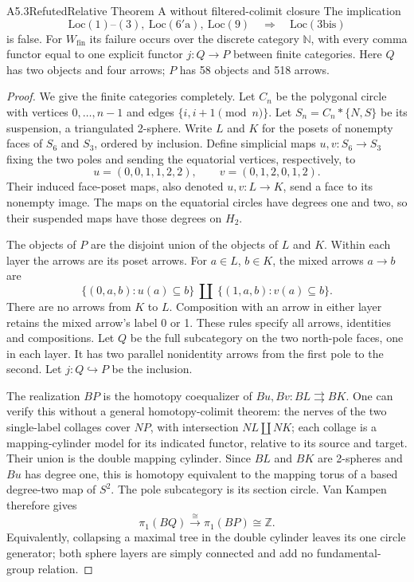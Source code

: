 \begin{claim}{A5.3}{Refuted}{Relative Theorem A without filtered-colimit closure}
\label{A53}
The implication
\[
 \mathrm{Loc}(1)\text{--}(3),\ \mathrm{Loc}(6'\mathrm a),\
 \mathrm{Loc}(9)\quad\Longrightarrow\quad\mathrm{Loc}(3\mathrm{bis})
\]
is false.  For $W_{\mathrm{fin}}$ its failure occurs over the discrete
category $\mathbb N$, with every comma functor equal to one explicit
functor $j:Q\to P$ between finite categories.  Here $Q$ has two objects
and four arrows; $P$ has 58 objects and 518 arrows.
\end{claim}
\begin{proof}
We give the finite categories completely.  Let $C_n$ be the polygonal
circle with vertices $0,\ldots,n-1$ and edges
$\{i,i+1\pmod n\}$.  Let $S_n=C_n*\{N,S\}$ be its suspension,
a triangulated 2-sphere.  Write $L$ and $K$ for the posets of nonempty
faces of $S_6$ and $S_3$, ordered by inclusion.  Define simplicial maps
$u,v:S_6\to S_3$ fixing the two poles and sending the equatorial
vertices, respectively, to
\[
 u=(0,0,1,1,2,2),\qquad v=(0,1,2,0,1,2).
\]
Their induced face-poset maps, also denoted $u,v:L\to K$, send a face
to its nonempty image.  The maps on the equatorial circles have degrees
one and two, so their suspended maps have those degrees on $H_2$.

The objects of $P$ are the disjoint union of the objects of $L$ and $K$.
Within each layer the arrows are its poset arrows.  For $a\in L$,
$b\in K$, the mixed arrows $a\to b$ are
\[
 \{(0,a,b):u(a)\subseteq b\}\ \amalg\
 \{(1,a,b):v(a)\subseteq b\}.
\]
There are no arrows from $K$ to $L$.  Composition with an arrow in
either layer retains the mixed arrow's label 0 or 1.  These rules
specify all arrows, identities and compositions.  Let $Q$ be the full
subcategory on the two north-pole faces, one in each layer.  It has
two parallel nonidentity arrows from the first pole to the second.
Let $j:Q\hookrightarrow P$ be the inclusion.

The realization $BP$ is the homotopy coequalizer of
$Bu,Bv:BL\rightrightarrows BK$.  One can verify this without a
general homotopy-colimit theorem: the nerves of the two single-label
collages cover $NP$, with intersection $NL\amalg NK$; each collage
is a mapping-cylinder model for its indicated functor, relative to its
source and target.  Their union is the double mapping cylinder.  Since
$BL$ and $BK$ are 2-spheres and $Bu$ has degree one, this is homotopy
equivalent to the mapping torus of a based degree-two map of $S^2$.
The pole subcategory is its section circle.  Van Kampen therefore gives
\[
                \pi_1(BQ)\xrightarrow{\cong}\pi_1(BP)\cong\mathbb Z.
\]
Equivalently, collapsing a maximal tree in the double cylinder leaves
its one circle generator; both sphere layers are simply connected and
add no fundamental-group relation.


\end{proof}

